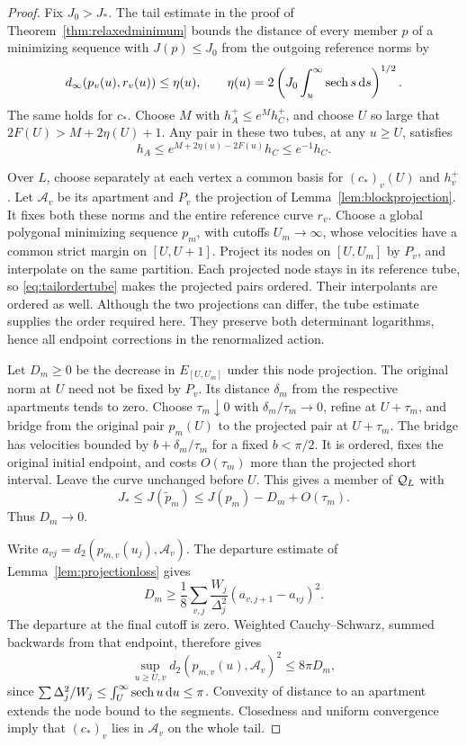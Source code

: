\begin{proof}
Fix $J_0>J_*$. The tail estimate in the proof of
Theorem~\ref{thm:relaxedminimum} bounds the distance of every member
$p$ of a minimizing sequence with $J(p)\le J_0$ from the outgoing
reference norms by
\[
 d_\infty(p_v(u),r_v(u))\le\eta(u),\qquad
 \eta(u)=2\left(J_0\int_u^\infty\operatorname{sech} s\,\mathrm d s\right)^{1/2}.
\]
The same holds for $c_*$. Choose $M$ with $h_A^+\le e^M h_C^+$,
and choose $U$ so large that $2F(U)>M+2\eta(U)+1$.
Any pair in these two tubes, at any $u\ge U$, satisfies
\begin{equation}\label{eq:tailordertube}
 h_A\le e^{M+2\eta(u)-2F(u)}h_C\le e^{-1}h_C.
\end{equation}

Over $L$, choose separately at each vertex a common basis for
$(c_*)_v(U)$ and $h_v^+$. Let $\mathcal A_v$ be its apartment and
$P_v$ the projection of Lemma~\ref{lem:blockprojection}. It fixes
both these norms and the entire reference curve $r_v$.
Choose a global polygonal minimizing sequence $p_m$, with cutoffs
$U_m\to\infty$, whose velocities have a common strict margin on
$[U,U+1]$. Project its nodes on $[U,U_m]$ by $P_v$, and interpolate
on the same partition. Each projected node stays in its reference
tube, so \eqref{eq:tailordertube} makes the projected pairs ordered.
Their interpolants are ordered as well. Although the two projections
can differ, the tube estimate supplies the order required here.
They preserve both determinant logarithms, hence all endpoint
corrections in the renormalized action.

Let $D_m\ge0$ be the decrease in $E_{[U,U_m]}$ under this node
projection. The original norm at $U$ need not be fixed by $P_v$.
Its distance $\delta_m$ from the respective apartments tends to
zero. Choose $\tau_m\downarrow0$ with $\delta_m/\tau_m\to0$,
refine at $U+\tau_m$, and bridge from the original pair $p_m(U)$
to the projected pair at $U+\tau_m$. The bridge has velocities
bounded by $b+\delta_m/\tau_m$ for a fixed $b<\pi/2$.
It is ordered, fixes the original initial endpoint, and costs
$O(\tau_m)$ more than the projected short interval. Leave the
curve unchanged before $U$. This gives a member of $\mathcal Q_L$ with
\[
 J_*\le J(\widetilde p_m)\le J(p_m)-D_m+O(\tau_m).
\]
Thus $D_m\to0$.

Write $a_{vj}=d_2(p_{m,v}(u_j),\mathcal A_v)$. The departure
estimate of Lemma~\ref{lem:projectionloss} gives
\[
 D_m\ge\frac18\sum_{v,j}\frac{W_j}{\Delta_j^2}
                       (a_{v,j+1}-a_{vj})^2.
\]
The departure at the final cutoff is zero. Weighted
Cauchy--Schwarz, summed backwards from that endpoint, therefore gives
\[
 \sup_{u\ge U,v}d_2(p_{m,v}(u),\mathcal A_v)^2
 \le8\pi D_m,
\]
since $\sum\Delta_j^2/W_j\le\int_U^\infty\operatorname{sech} u\,\mathrm d u\le\pi$.
Convexity of distance to an apartment extends the node bound to the
segments. Closedness and uniform convergence imply that $(c_*)_v$
lies in $\mathcal A_v$ on the whole tail.


\end{proof}

